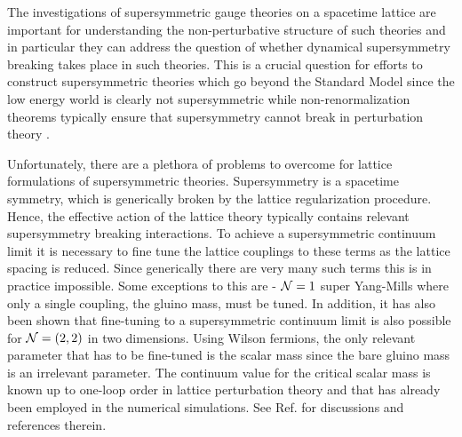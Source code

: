 The investigations of supersymmetric gauge theories on a spacetime lattice are important for understanding the non-perturbative structure of such theories and in particular they can address the question of whether dynamical supersymmetry breaking takes place in such theories. This is a crucial question for efforts to construct supersymmetric theories which go beyond the Standard Model since the low energy world is clearly not supersymmetric while non-renormalization theorems typically ensure that supersymmetry cannot break in perturbation theory \cite{Grisaru:1979wc}.

Unfortunately, there are a plethora of problems to overcome for lattice formulations of supersymmetric theories. Supersymmetry is a spacetime symmetry, which is generically broken by the lattice regularization procedure. Hence, the effective action of the lattice theory typically contains relevant supersymmetry breaking interactions. To achieve a supersymmetric continuum limit it is necessary to  fine tune the lattice couplings to these terms as the lattice spacing is reduced. Since generically there are very many such terms this is in practice impossible.  Some exceptions to this are - $\mathcal N = 1$ super Yang-Mills where only a single coupling, the gluino mass, must be tuned. In addition, it has also been shown that fine-tuning to a supersymmetric
continuum limit is also possible for $\mathcal N = (2,2) $ in two dimensions. Using
Wilson fermions, the only relevant parameter that has to be fine-tuned
is the scalar mass since the bare gluino mass is an irrelevant parameter. The
continuum value for the critical scalar mass is known up to one-loop
order in lattice perturbation theory and that has already been employed in the numerical simulations. See Ref. \cite{Montvay:2001aj, Suzuki:2005dx,August:2018esp} for discussions and references therein. 

